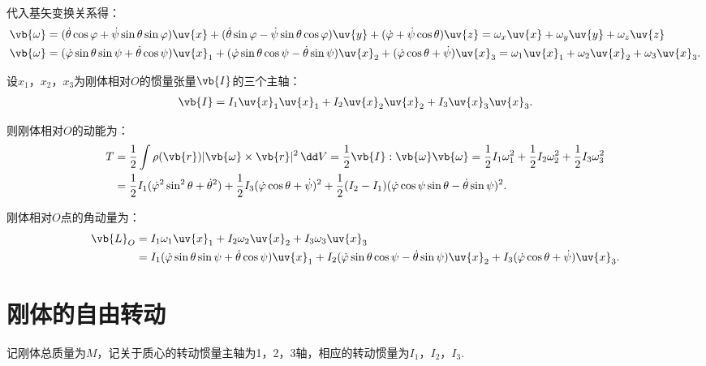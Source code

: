 代入基矢变换关系得：
\begin{align*}
	\vb{\omega} & = (\dot{\theta} \cos \varphi + \dot{\psi} \sin \theta \sin \varphi) \uv{x} + (\dot{\theta} \sin \varphi - \dot{\psi} \sin \theta \cos \varphi) \uv{y} + (\dot{\varphi} + \dot{\psi} \cos \theta) \uv{z}=\omega_x \uv{x}+\omega_y \uv{y}+\omega_z \uv{z}        \\
	\vb{\omega} & = (\dot{\varphi} \sin \theta \sin \psi + \dot{\theta} \cos \psi) \uv{x}_1 + (\dot{\varphi} \sin \theta \cos \psi - \dot{\theta} \sin \psi) \uv{x}_2 + (\dot{\varphi} \cos \theta + \dot{\psi}) \uv{x}_3=\omega_1 \uv{x}_1+\omega_2 \uv{x}_2+\omega_3 \uv{x}_3.
\end{align*}

设\(x_1\)，\(x_2\)，\(x_3\)为刚体相对\(O\)的惯量张量\(\vb{I}\)的三个主轴：
\begin{align*}
	\vb{I} = I_1 \uv{x}_1 \uv{x}_1 + I_2 \uv{x}_2 \uv{x}_2 + I_3 \uv{x}_3 \uv{x}_3.
\end{align*}

则刚体相对\(O\)的动能为：
\begin{align*}
	T & = \frac{1}{2} \int \rho(\vb{r}) |\vb{\omega} \times \vb{r}|^2 \, \dd V = \frac{1}{2} \vb{I} : \vb{\omega} \vb{\omega} = \frac{1}{2} I_1 \omega_1^2 + \frac{1}{2} I_2 \omega_2^2 + \frac{1}{2} I_3 \omega_3^2\notag           \\
	  & = \frac{1}{2} I_1 (\dot{\varphi}^2 \sin^2 \theta + \dot{\theta}^2) + \frac{1}{2} I_3 (\dot{\varphi} \cos \theta + \dot{\psi})^2 + \frac{1}{2} (I_2 - I_1) (\dot{\varphi} \cos \psi \sin \theta - \dot{\theta} \sin \psi)^2.
\end{align*}

刚体相对\(O\)点的角动量为：
\begin{align*}
	\vb{L}_{O} & = I_1 \omega_1 \uv{x}_1 + I_2 \omega_2 \uv{x}_2 + I_3 \omega_3 \uv{x}_3\notag                                                                                                                                        \\
	           & = I_1 (\dot{\varphi} \sin \theta \sin \psi + \dot{\theta} \cos \psi) \uv{x}_1 + I_2 (\dot{\varphi} \sin \theta \cos \psi - \dot{\theta} \sin \psi) \uv{x}_2 + I_3 (\dot{\varphi} \cos \theta + \dot{\psi}) \uv{x}_3.
\end{align*}
\section{刚体的自由转动}
记刚体总质量为\(M\)，记关于质心的转动惯量主轴为1，2，3轴，相应的转动惯量为\(I_1\)，\(I_2\)，\(I_3\).

